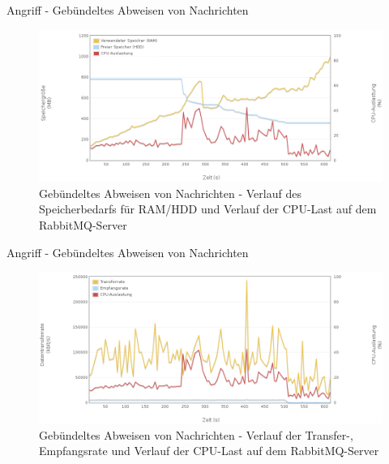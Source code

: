 \documentclass[10pt]{beamer}
\begin{document}
\begin{frame}{Angriff - Gebündeltes Abweisen von Nachrichten}
\begin{figure}[!htb]
	\centering
	\includegraphics[width=\textwidth]{img/nack/nack_server1.png}
	\caption{\centering Gebündeltes Abweisen von Nachrichten - Verlauf des Speicherbedarfs für RAM/HDD und Verlauf der CPU-Last auf dem RabbitMQ-Server}
	\label{fig:nack-server1}
\end{figure}
\end{frame}
		
\begin{frame}{Angriff - Gebündeltes Abweisen von Nachrichten}
\begin{figure}[!htb]
	\centering
	\includegraphics[width=\textwidth]{img/nack/nack_server2.png}
	\caption{\centering Gebündeltes Abweisen von Nachrichten - Verlauf der Transfer-, Empfangsrate und Verlauf der CPU-Last auf dem RabbitMQ-Server}
	\label{fig:nack-server2}
\end{figure}
\end{frame}
\end{document}
